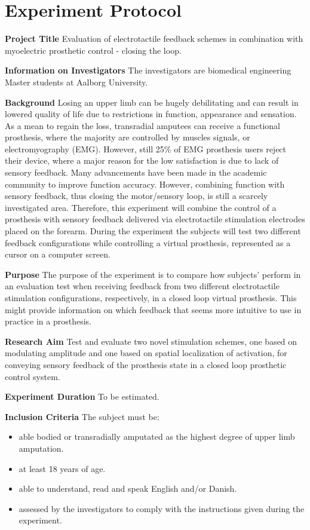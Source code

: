 \section{Experiment Protocol}

\textbf{Project Title}
Evaluation of electrotactile feedback schemes in combination with myoelectric prosthetic control - closing the loop. 

\textbf{Information on Investigators}
The investigators are biomedical engineering Master students at Aalborg University. 

\textbf{Background}
Losing an upper limb can be hugely debilitating and can result in lowered quality of life due to restrictions in function, appearance and sensation. As a mean to regain the loss, transradial amputees can receive a functional prosthesis, where the majority are controlled by muscles signals, or electromyography (EMG). However, still 25\% of EMG prosthesis users reject their device, where a major reason for the low satisfaction is due to lack of sensory feedback.
Many advancements have been made in the academic community to improve function accuracy. However, combining function with sensory feedback, thus closing the motor/sensory loop, is still a scarcely investigated area. Therefore, this experiment will combine the control of a prosthesis with sensory feedback delivered via electrotactile stimulation electrodes placed on the forearm. During the experiment the subjects will test two different feedback configurations while controlling a virtual prosthesis, represented as a cursor on a computer screen.  

\textbf{Purpose}
The purpose of the experiment is to compare how subjects' perform in an evaluation test when receiving feedback from two different electrotactile stimulation configurations, respectively, in a closed loop virtual prosthesis. This might provide information on which feedback that seems more intuitive to use in practice in a prosthesis.


\textbf{Research Aim}
Test and evaluate two novel stimulation schemes, one based on modulating amplitude and one based on spatial localization of activation, for conveying sensory feedback of the prosthesis state in a closed loop prosthetic control system.

\textbf{Experiment Duration}
To be estimated.

\textbf{Inclusion Criteria}
The subject must be:
\begin{itemize}
	\item able bodied or transradially amputated as the highest degree of upper limb amputation.
	\item at least 18 years of age.
	\item able to understand, read and speak English and/or Danish.
	\item assessed by the investigators to comply with the instructions given during the experiment.
\end{itemize}

